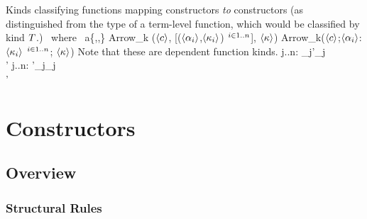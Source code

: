 \documentclass[12pt,twoside,fleqn]{article}
\begin{document}
   {Kinds classifying functions mapping constructors \textit{to}
    constructors (as distinguished from the type of a term-level function,
    which would be classified by kind $T$.)}
   {\quad
    \mbox{\ where\ } a\in\{,,\}}
   {Arrow\_k ($\langle{c}\rangle$, 
        [($\langle{\alpha_i}\rangle$,$\langle{\kappa_i}\rangle$)$\ {}^{i\in 1..n}$],
        $\langle{\kappa}\rangle$)}
   {Arrow\_k($\langle{c}\rangle$;$\langle{\alpha_i}\rangle$:$\langle{\kappa_i}\rangle$$\ {}^{i\in 1..n}$;
             $\langle{\kappa}\rangle$)}
   {Note that these are dependent function kinds.}
   {\irule
    {\validkind{\context}{\kind}\qquad
      }
     {}
    \irule
      {\forall j..n:\quad
                    {\kind_j}{\kind'_j}\\
                 {\kind}{\kind'}}
      {\equivkind{\context}
         {}
         {}}
    \irule
      {\forall j..n:\quad
                    {\kind'_j}{\kind_j}\\
                 {\kind}{\kind'}}
      {\subkind{\context}
         {}
         {}}
   }

\section{Constructors}

\subsection{Overview}

\subsubsection{Structural Rules}

\irule
  {\validconstructor{\context}{\constructor}{\kind}}
  {\equivconstructor{\context}{\constructor}{\constructor}{\kind}}
\end{document}
